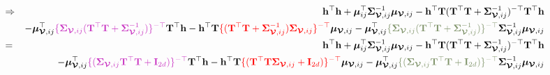 \documentclass[12pt]{article}
\newcommand{\0}{\mathbf{0}}
\begin{document}
\begin{eqnarray*}
& \Rightarrow & \mathbf{h}^{\top} \mathbf{h} + \boldsymbol{\mu}_{ij}^{\top} \boldsymbol{\Sigma}_{\boldsymbol{\mathcal{V}}, ij}^{-1} \boldsymbol{\mu}_{\boldsymbol{\mathcal{V}}, ij} -  \mathbf{h}^{\top} \mathbf{T} ( \mathbf{T}^{\top} \mathbf{T} + \boldsymbol{\Sigma}_{\boldsymbol{\mathcal{V}}, ij}^{-1} )^{-\top} \mathbf{T}^{\top} \mathbf{h} \\
&& - \boldsymbol{\mu}_{\boldsymbol{\mathcal{V}}, ij}^{\top}  \textcolor{purple2}{ \{ \boldsymbol{\Sigma}_{\boldsymbol{\mathcal{V}}, ij} ( \mathbf{T}^{\top} \mathbf{T} + \boldsymbol{\Sigma}_{\boldsymbol{\mathcal{V}}, ij}^{-1} ) \}^{-\top}} \mathbf{T}^{\top} \mathbf{h} -  \mathbf{h}^{\top} \mathbf{T} \textcolor{red}{ \{ ( \mathbf{T}^{\top} \mathbf{T} + \boldsymbol{\Sigma}_{\boldsymbol{\mathcal{V}}, ij}^{-1} ) \boldsymbol{\Sigma}_{\boldsymbol{\mathcal{V}}, ij} \}^{-\top}} \boldsymbol{\mu}_{\boldsymbol{\mathcal{V}}, ij}  -  \boldsymbol{\mu}_{\boldsymbol{\mathcal{V}}, ij}^{\top} \textcolor{olive}{ \{ \boldsymbol{\Sigma}_{\boldsymbol{\mathcal{V}}, ij} ( \mathbf{T}^{\top} \mathbf{T} + \boldsymbol{\Sigma}_{\boldsymbol{\mathcal{V}}, ij}^{-1} ) \}^{-\top}} \boldsymbol{\Sigma}_{\boldsymbol{\mathcal{V}}, ij}^{-1}\boldsymbol{\mu}_{\boldsymbol{\mathcal{V}}, ij} \\
& = & \mathbf{h}^{\top} \mathbf{h} + \boldsymbol{\mu}_{ij}^{\top} \boldsymbol{\Sigma}_{\boldsymbol{\mathcal{V}}, ij}^{-1} \boldsymbol{\mu}_{\boldsymbol{\mathcal{V}}, ij} -  \mathbf{h}^{\top} \mathbf{T} ( \mathbf{T}^{\top} \mathbf{T} + \boldsymbol{\Sigma}_{\boldsymbol{\mathcal{V}}, ij}^{-1} )^{-\top} \mathbf{T}^{\top} \mathbf{h} \\
&& - \boldsymbol{\mu}_{\boldsymbol{\mathcal{V}}, ij}^{\top}  \textcolor{purple2}{ \{ ( \boldsymbol{\Sigma}_{\boldsymbol{\mathcal{V}}, ij} \mathbf{T}^{\top} \mathbf{T} + \mathbf{I}_{2d} ) \}^{-\top}} \mathbf{T}^{\top} \mathbf{h} -  \mathbf{h}^{\top} \mathbf{T} \textcolor{red}{ \{ ( \mathbf{T}^{\top} \mathbf{T} \boldsymbol{\Sigma}_{\boldsymbol{\mathcal{V}}, ij} + \mathbf{I}_{2d} ) \}^{-\top}} \boldsymbol{\mu}_{\boldsymbol{\mathcal{V}}, ij} -  \boldsymbol{\mu}_{\boldsymbol{\mathcal{V}}, ij}^{\top} \textcolor{olive}{ \{ ( \boldsymbol{\Sigma}_{\boldsymbol{\mathcal{V}}, ij} \mathbf{T}^{\top} \mathbf{T} + \mathbf{I}_{2d} ) \}^{-\top}} \boldsymbol{\Sigma}_{\boldsymbol{\mathcal{V}}, ij}^{-1}\boldsymbol{\mu}_{\boldsymbol{\mathcal{V}}, ij} 
\end{eqnarray*}
\end{document}
